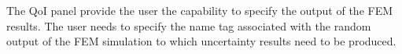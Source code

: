 The QoI panel provide the user the capability to specify the output of the FEM results. The user needs to specify the name tag associated with the random output of the FEM simulation to which uncertainty results need to be produced. 